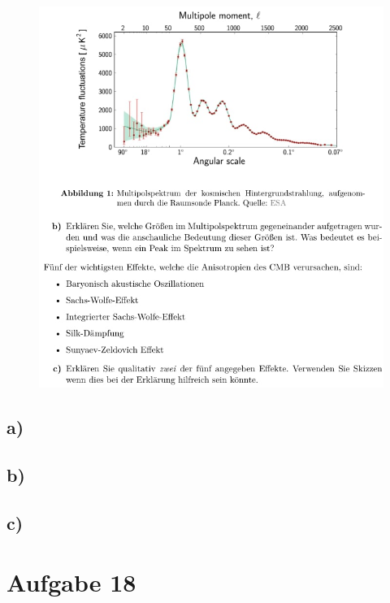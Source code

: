     \begin{figure}[H]
        \centering
        \includegraphics[width=\textwidth]{images/Aufgabe17b.jpg}
        \label{fig:4}
    \end{figure}

\subsection{a)}

\subsection{b)}

\subsection{c)}





\section{Aufgabe 18}

